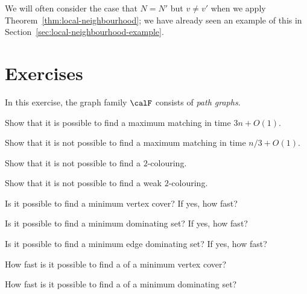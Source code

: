 We will often consider the case that $N = N'$ but $v \ne v'$ when we apply Theorem~\ref{thm:local-neighbourhood}; we have already seen an example of this in Section~\ref{sec:local-neighbourhood-example}.


\section{Exercises}

\begin{ex}
    In this exercise, the graph family $\calF$ consists of \emph{path graphs}.
    \begin{subex}
        \item Show that it is possible to find a maximum matching in time $3n+O(1)$.
        \item Show that it is not possible to find a maximum matching in time $n/3+O(1)$.
        \item Show that it is not possible to find a $2$-colouring.
        \item Show that it is not possible to find a weak $2$-colouring.
        \item Is it possible to find a minimum vertex cover? If yes, how fast?
        \item Is it possible to find a minimum dominating set? If yes, how fast?
        \item Is it possible to find a minimum edge dominating set? If yes, how fast?
        \item How fast is it possible to find a  of a minimum vertex cover?
        \item How fast is it possible to find a  of a minimum dominating set?
    \end{subex}
\end{ex}

